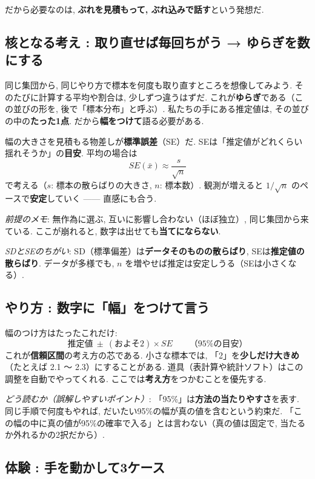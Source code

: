     だから必要なのは, \textbf{ぶれを見積もって, ぶれ込みで話す}という発想だ.

  \subsection{核となる考え : 取り直せば毎回ちがう → ゆらぎを数にする}
    同じ集団から, 同じやり方で標本を何度も取り直すところを想像してみよう.  
    そのたびに計算する平均や割合は, 少しずつ違うはずだ. これが\textbf{ゆらぎ}である（この並びの形を, 後で「標本分布」と呼ぶ）.  
    私たちの手にある推定値は, その並びの中の\textbf{たった1点}. だから\textbf{幅をつけて}語る必要がある.

    幅の大きさを見積もる物差しが\textbf{標準誤差}（SE）だ.  
    SEは「推定値がどれくらい揺れそうか」の\textbf{目安}. 平均の場合は
    \[
      SE(\bar{x}) \approx \frac{s}{\sqrt{n}}
    \]
    で考える（$s$: 標本の散らばりの大きさ, $n$: 標本数）.  
    観測が増えると $1/\sqrt{n}$ のペースで\textbf{安定}していく —— 直感にも合う.

    \textit{前提のメモ}: 無作為に選ぶ, 互いに影響し合わない（ほぼ独立）, 同じ集団から来ている.  
    ここが崩れると, 数字は出せても\textbf{当てにならない}.

    \textit{SDとSEのちがい}:  
    SD（標準偏差）は\textbf{データそのものの散らばり}, SEは\textbf{推定値の散らばり}.  
    データが多様でも, $n$ を増やせば推定は安定しうる（SEは小さくなる）.

  \subsection{やり方 : 数字に「幅」をつけて言う}
    幅のつけ方はたったこれだけ:
    \[
      \text{推定値} \ \pm \ (\text{およそ}2) \times SE \qquad \text{（95\%の目安）}
    \]
    これが\textbf{信頼区間}の考え方の芯である. 小さな標本では, 「2」を\textbf{少しだけ大きめ}（たとえば 2.1 〜 2.3）にすることがある.  
    道具（表計算や統計ソフト）はこの調整を自動でやってくれる. ここでは\textbf{考え方}をつかむことを優先する.

    \textit{どう読むか（誤解しやすいポイント）}:  
    「95\%」は\textbf{方法の当たりやすさ}を表す. 同じ手順で何度もやれば, だいたい95\%の幅が真の値を含むという約束だ.  
    「この幅の中に真の値が95\%の確率で入る」とは言わない（真の値は固定で, 当たるか外れるかの2択だから）.

  \subsection{体験 : 手を動かして3ケース}
